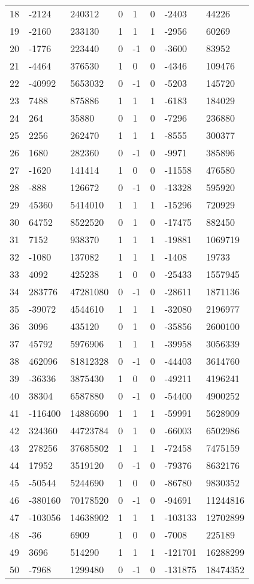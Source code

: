 \documentclass{amsart}
\begin{document}
\begin{longtable}{|l|l|l|lllll|}
18&-2124&240312&0&1&0&-2403&44226\\
19&-2160&233130&1&1&1&-2956&60269\\
20&-1776&223440&0&-1&0&-3600&83952\\
21&-4464&376530&1&0&0&-4346&109476\\
22&-40992&5653032&0&-1&0&-5203&145720\\
23&7488&875886&1&1&1&-6183&184029\\
24&264&35880&0&1&0&-7296&236880\\
25&2256&262470&1&1&1&-8555&300377\\
26&1680&282360&0&-1&0&-9971&385896\\
27&-1620&141414&1&0&0&-11558&476580\\
28&-888&126672&0&-1&0&-13328&595920\\
29&45360&5414010&1&1&1&-15296&720929\\
30&64752&8522520&0&1&0&-17475&882450\\
31&7152&938370&1&1&1&-19881&1069719\\
32&-1080&137082&1&1&1&-1408&19733\\
33&4092&425238&1&0&0&-25433&1557945\\
34&283776&47281080&0&-1&0&-28611&1871136\\
35&-39072&4544610&1&1&1&-32080&2196977\\
36&3096&435120&0&1&0&-35856&2600100\\
37&45792&5976906&1&1&1&-39958&3056339\\
38&462096&81812328&0&-1&0&-44403&3614760\\
39&-36336&3875430&1&0&0&-49211&4196241\\
40&38304&6587880&0&-1&0&-54400&4900252\\
41&-116400&14886690&1&1&1&-59991&5628909\\
42&324360&44723784&0&1&0&-66003&6502986\\
43&278256&37685802&1&1&1&-72458&7475159\\
44&17952&3519120&0&-1&0&-79376&8632176\\
45&-50544&5244690&1&0&0&-86780&9830352\\
46&-380160&70178520&0&-1&0&-94691&11244816\\
47&-103056&14638902&1&1&1&-103133&12702899\\
48&-36&6909&1&0&0&-7008&225189\\
49&3696&514290&1&1&1&-121701&16288299\\
50&-7968&1299480&0&-1&0&-131875&18474352\\
\hline
\end{longtable}
\end{document}
